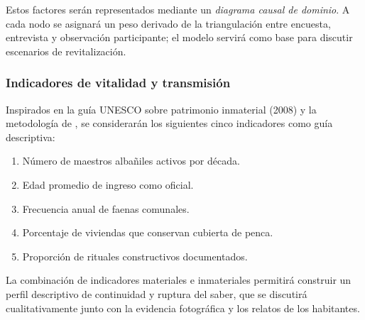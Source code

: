 Estos factores serán representados mediante un \emph{diagrama causal de
	dominio}.  A cada nodo se asignará un peso derivado de la triangulación
entre encuesta, entrevista y observación participante; el modelo
servirá como base para discutir escenarios de revitalización.

\subsubsection{Indicadores de vitalidad y transmisión}

Inspirados en la guía UNESCO sobre patrimonio inmaterial (2008) y la
metodología de \cite{gandara2000}, se considerarán los siguientes cinco
indicadores como guía descriptiva:

\begin{enumerate}
	\item Número de maestros albañiles activos por década.
	\item Edad promedio de ingreso como oficial.
	\item Frecuencia anual de faenas comunales.
	\item Porcentaje de viviendas que conservan cubierta de penca.
	\item Proporción de rituales constructivos documentados.
\end{enumerate}

La combinación de indicadores materiales e inmateriales permitirá
construir un perfil descriptivo de continuidad y ruptura del saber, que
se discutirá cualitativamente junto con la evidencia fotográfica y los
relatos de los habitantes.
